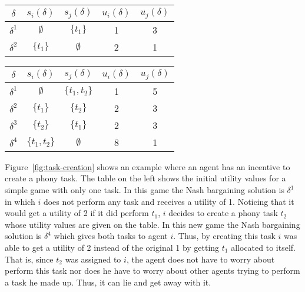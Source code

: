 \begin{SCfigure}
  \begin{minipage}{1.0\linewidth}
    \begin{center}
     \begin{tabular}{ccccc} \toprule
      $\delta$ & $s_i(\delta)$ & $s_j(\delta)$ & $u_i(\delta)$ &
      $u_j(\delta)$ \\ \midrule
      $\delta^1$ & $\emptyset$ & $\{t_1\}$ & 1 & 3 \\
      $\delta^2$ & $\{t_1\}$ & $\emptyset$ & 2 & 1 \\ \bottomrule
    \end{tabular}

    \medskip

    \begin{tabular}{ccccc} \toprule
      $\delta$ & $s_i(\delta)$ & $s_j(\delta)$ & $u_i(\delta)$ &
      $u_j(\delta)$ \\ \midrule
      $\delta^1$ & $\emptyset$ & $\{t_1,t_2\}$ & 1 & 5 \\
      $\delta^2$ & $\{t_1\}$ & $\{t_2\}$ & 2 & 3 \\
      $\delta^3$ & $\{t_2\}$ & $\{t_1\}$ & 2 & 3 \\
      $\delta^4$ & $\{t_1,t_2\}$ & $\emptyset$ & 8 & 1 \\ \bottomrule
    \end{tabular}
    \end{center}
  \end{minipage}
  \caption{Lying by task creation example. The top table shows the
    original utility values, where $\delta^1$ is the Nash bargaining
    solution.  The bottom table shows the values after agent $i$
    creates phony task $t_2$. Here, $\delta^4$ is the Nash
    bargaining solution.}
  \label{fig:task-creation}
\end{SCfigure}

Figure~\ref{fig:task-creation} shows an example where an agent has an
incentive to create a phony task. The table on the left shows the
initial utility values for a simple game with only one task. In this
game the Nash bargaining solution is $\delta^1$ in which $i$ does not
perform any task and receives a utility of 1. Noticing that it would
get a utility of 2 if it did perform $t_1$, $i$ decides to create a
phony task $t_2$ whose utility values are given on the table. In this
new game the Nash bargaining solution is $\delta^4$ which gives both
tasks to agent $i$. Thus, by creating this task $i$ was able to get a
utility of 2 instead of the original 1 by getting $t_1$ allocated to
itself. That is, since $t_2$ was assigned to $i$, the agent does not
have to worry about perform this task nor does he have to worry about
other agents trying to perform a task he made up. Thus, it can lie and
get away with it.

